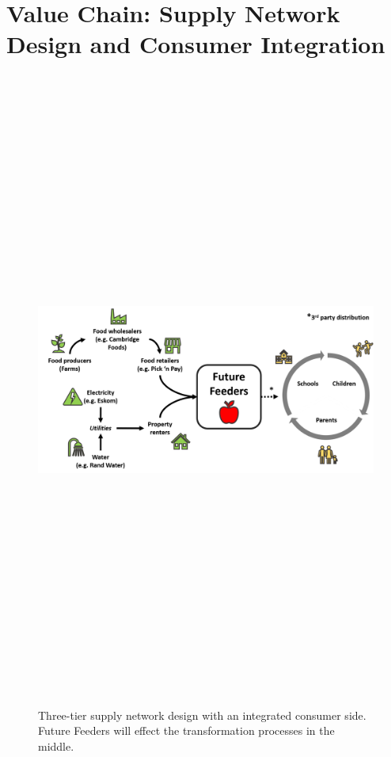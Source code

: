 \section{Value Chain: Supply Network Design and Consumer Integration}
\label{app:network}

\begin{figure}[H]
    \centering
    \includegraphics[angle=90, height=21cm]{op_spider.png}
    \caption{Three-tier supply network design with an integrated consumer side. Future Feeders will effect the transformation processes in the middle.}
    \label{fig:spider}
\end{figure}

